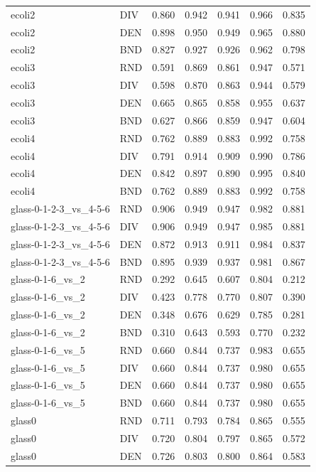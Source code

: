 \documentclass[10pt,a4paper]{article}
\begin{document}
\begin{longtable}{lllllrr}
ecoli2 & DIV & 0.860 & 0.942 & 0.941 & 0.966 & 0.835 \\
ecoli2 & DEN & 0.898 & 0.950 & 0.949 & 0.965 & 0.880 \\
ecoli2 & BND & 0.827 & 0.927 & 0.926 & 0.962 & 0.798 \\
ecoli3 & RND & 0.591 & 0.869 & 0.861 & 0.947 & 0.571 \\
ecoli3 & DIV & 0.598 & 0.870 & 0.863 & 0.944 & 0.579 \\
ecoli3 & DEN & 0.665 & 0.865 & 0.858 & 0.955 & 0.637 \\
ecoli3 & BND & 0.627 & 0.866 & 0.859 & 0.947 & 0.604 \\
ecoli4 & RND & 0.762 & 0.889 & 0.883 & 0.992 & 0.758 \\
ecoli4 & DIV & 0.791 & 0.914 & 0.909 & 0.990 & 0.786 \\
ecoli4 & DEN & 0.842 & 0.897 & 0.890 & 0.995 & 0.840 \\
ecoli4 & BND & 0.762 & 0.889 & 0.883 & 0.992 & 0.758 \\
glass-0-1-2-3\_vs\_4-5-6 & RND & 0.906 & 0.949 & 0.947 & 0.982 & 0.881 \\
glass-0-1-2-3\_vs\_4-5-6 & DIV & 0.906 & 0.949 & 0.947 & 0.985 & 0.881 \\
glass-0-1-2-3\_vs\_4-5-6 & DEN & 0.872 & 0.913 & 0.911 & 0.984 & 0.837 \\
glass-0-1-2-3\_vs\_4-5-6 & BND & 0.895 & 0.939 & 0.937 & 0.981 & 0.867 \\
glass-0-1-6\_vs\_2 & RND & 0.292 & 0.645 & 0.607 & 0.804 & 0.212 \\
glass-0-1-6\_vs\_2 & DIV & 0.423 & 0.778 & 0.770 & 0.807 & 0.390 \\
glass-0-1-6\_vs\_2 & DEN & 0.348 & 0.676 & 0.629 & 0.785 & 0.281 \\
glass-0-1-6\_vs\_2 & BND & 0.310 & 0.643 & 0.593 & 0.770 & 0.232 \\
glass-0-1-6\_vs\_5 & RND & 0.660 & 0.844 & 0.737 & 0.983 & 0.655 \\
glass-0-1-6\_vs\_5 & DIV & 0.660 & 0.844 & 0.737 & 0.980 & 0.655 \\
glass-0-1-6\_vs\_5 & DEN & 0.660 & 0.844 & 0.737 & 0.980 & 0.655 \\
glass-0-1-6\_vs\_5 & BND & 0.660 & 0.844 & 0.737 & 0.980 & 0.655 \\
glass0 & RND & 0.711 & 0.793 & 0.784 & 0.865 & 0.555 \\
glass0 & DIV & 0.720 & 0.804 & 0.797 & 0.865 & 0.572 \\
glass0 & DEN & 0.726 & 0.803 & 0.800 & 0.864 & 0.583 \\

\end{longtable}
\end{document}
